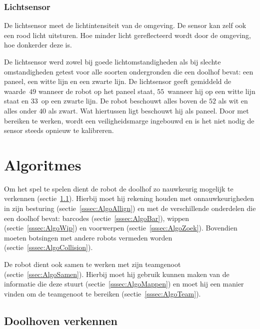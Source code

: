 \documentclass[eind]{penoverslag}
\begin{document}

\subsubsection{Lichtsensor}
De lichtsensor meet de lichtintensiteit van de omgeving. De sensor kan zelf ook een rood licht uitsturen. Hoe minder licht gereflecteerd wordt door de omgeving, hoe donkerder deze is.

De lichtsensor werd zowel bij goede lichtomstandigheden als bij slechte omstandigheden getest voor alle soorten ondergronden die een doolhof bevat: een paneel, een witte lijn en een zwarte lijn.
De lichtsensor geeft gemiddeld de waarde~$49$ wanneer de robot op het paneel staat, $55$~wanneer hij op een witte lijn staat en $33$~op een zwarte lijn. De robot beschouwt alles boven de $52$ als wit en alles onder $40$ als zwart. Wat hiertussen ligt beschouwt hij als paneel. Door met bereiken te werken, wordt een veiligheidsmarge ingebouwd en is het niet nodig de sensor steeds opnieuw te kalibreren.



\section{Algoritmes}
\label{sec:Algo}

Om het spel te spelen dient de robot de doolhof zo nauwkeurig mogelijk te verkennen (sectie~\ref{ssec:AlgoVerken}). Hierbij moet hij rekening houden met onnauwkeurigheden in zijn besturing (sectie~\ref{sssec:AlgoAllign}) en met de verschillende onderdelen die een doolhof bevat: barcodes (sectie~\ref{sssec:AlgoBar}), wippen (sectie~\ref{sssec:AlgoWip}) en voorwerpen (sectie~\ref{sssec:AlgoZoek}). Bovendien moeten botsingen met andere robots vermeden worden (sectie~\ref{sssec:AlgoCollision}).

De robot dient ook samen te werken met zijn teamgenoot (sectie~\ref{ssec:AlgoSamen}). Hierbij moet hij gebruik kunnen maken van de informatie die deze stuurt (sectie~\ref{sssec:AlgoMappen}) en moet hij een manier vinden om de teamgenoot te bereiken (sectie~\ref{sssec:AlgoTeam}).


\subsection{Doolhoven verkennen}
\label{ssec:AlgoVerken}
\end{document}
